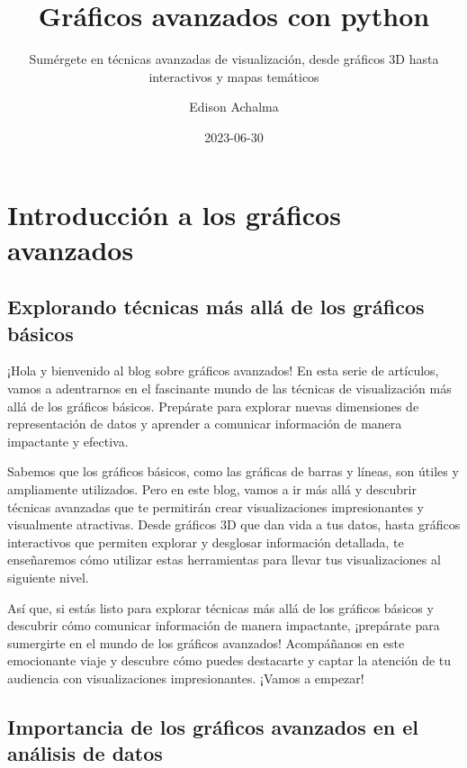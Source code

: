 \documentclass[
  a4paper,
]{article}
\title{Gráficos avanzados con python}
\subtitle{Sumérgete en técnicas avanzadas de visualización, desde
gráficos 3D hasta interactivos y mapas temáticos}
\author{Edison Achalma}
\date{2023-06-30}
\begin{document}
\maketitle
\ifdefined\Shaded\renewenvironment{Shaded}{\begin{tcolorbox}[interior hidden, frame hidden, borderline west={3pt}{0pt}{shadecolor}, breakable, sharp corners, boxrule=0pt, enhanced]}{\end{tcolorbox}}\fi

\hypertarget{introducciuxf3n-a-los-gruxe1ficos-avanzados}{%
\section{Introducción a los gráficos
avanzados}\label{introducciuxf3n-a-los-gruxe1ficos-avanzados}}

\hypertarget{explorando-tuxe9cnicas-muxe1s-alluxe1-de-los-gruxe1ficos-buxe1sicos}{%
\subsection{Explorando técnicas más allá de los gráficos
básicos}\label{explorando-tuxe9cnicas-muxe1s-alluxe1-de-los-gruxe1ficos-buxe1sicos}}

¡Hola y bienvenido al blog sobre gráficos avanzados! En esta serie de
artículos, vamos a adentrarnos en el fascinante mundo de las técnicas de
visualización más allá de los gráficos básicos. Prepárate para explorar
nuevas dimensiones de representación de datos y aprender a comunicar
información de manera impactante y efectiva.

Sabemos que los gráficos básicos, como las gráficas de barras y líneas,
son útiles y ampliamente utilizados. Pero en este blog, vamos a ir más
allá y descubrir técnicas avanzadas que te permitirán crear
visualizaciones impresionantes y visualmente atractivas. Desde gráficos
3D que dan vida a tus datos, hasta gráficos interactivos que permiten
explorar y desglosar información detallada, te enseñaremos cómo utilizar
estas herramientas para llevar tus visualizaciones al siguiente nivel.

Así que, si estás listo para explorar técnicas más allá de los gráficos
básicos y descubrir cómo comunicar información de manera impactante,
¡prepárate para sumergirte en el mundo de los gráficos avanzados!
Acompáñanos en este emocionante viaje y descubre cómo puedes destacarte
y captar la atención de tu audiencia con visualizaciones impresionantes.
¡Vamos a empezar!

\hypertarget{importancia-de-los-gruxe1ficos-avanzados-en-el-anuxe1lisis-de-datos}{%
\subsection{Importancia de los gráficos avanzados en el análisis de
datos}\label{importancia-de-los-gruxe1ficos-avanzados-en-el-anuxe1lisis-de-datos}}
\end{document}
